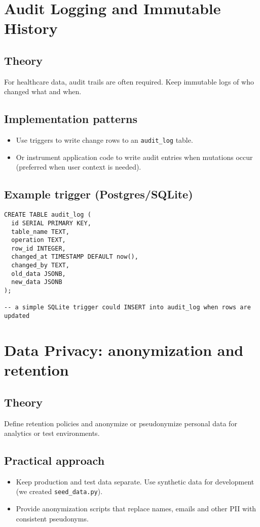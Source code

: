 \documentclass[11pt,a4paper]{article}
\begin{document}
\section{Audit Logging and Immutable History}
\subsection{Theory}
For healthcare data, audit trails are often required. Keep immutable logs of who changed what and when.

\subsection{Implementation patterns}
\begin{itemize}
  \item Use triggers to write change rows to an \texttt{audit_log} table.
  \item Or instrument application code to write audit entries when mutations occur (preferred when user context is needed).
\end{itemize}

\subsection{Example trigger (Postgres/SQLite)}
\begin{lstlisting}
CREATE TABLE audit_log (
  id SERIAL PRIMARY KEY,
  table_name TEXT,
  operation TEXT,
  row_id INTEGER,
  changed_at TIMESTAMP DEFAULT now(),
  changed_by TEXT,
  old_data JSONB,
  new_data JSONB
);

-- a simple SQLite trigger could INSERT into audit_log when rows are updated
\end{lstlisting}

\section{Data Privacy: anonymization and retention}
\subsection{Theory}
Define retention policies and anonymize or pseudonymize personal data for analytics or test environments.

\subsection{Practical approach}
\begin{itemize}
  \item Keep production and test data separate. Use synthetic data for development (we created \texttt{seed_data.py}).
  \item Provide anonymization scripts that replace names, emails and other PII with consistent pseudonyms.
\end{itemize}
\end{document}
